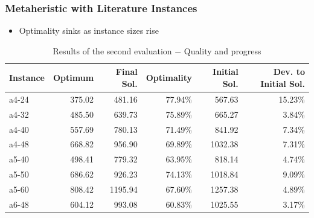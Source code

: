 \documentclass{beamer}
\begin{document}
\begin{frame}
\frametitle{Metaheristic with Literature Instances}
\begin{itemize}
\item Optimality sinks as instance sizes rise
\end{itemize}
\begin{table}[H]
\centering
\caption{Results of the second evaluation $-$ Quality and progress}
\scriptsize
{}
\begin{tabular}{l | r | r | r | r | r}
\hline
Instance & Optimum & Final Sol. & Optimality & Initial Sol. & Dev. to Initial Sol.\\
\hline
a4-24 & 	375.02 & 	481.16 & 	77.94\% & 	567.63 & 	15.23\% \\
a4-32 & 	485.50 & 	639.73 & 	75.89\% & 	665.27 & 	3.84\% \\
a4-40 & 	557.69 & 	780.13 & 	71.49\% & 	841.92 & 	7.34\% \\
a4-48 & 	668.82 & 	956.90 & 	69.89\% & 	1032.38 & 	7.31\% \\
a5-40 & 	498.41 & 	779.32 & 	63.95\% & 	818.14 & 	4.74\% \\
a5-50 & 	686.62 & 	926.23 & 	74.13\% & 	1018.84 & 	9.09\% \\
a5-60 & 	808.42 & 	1195.94 & 	67.60\% & 	1257.38 & 	4.89\% \\
a6-48 & 	604.12 & 	993.08 & 	60.83\% & 	1025.55 & 	3.17\% \\
\hline
\end{tabular}
\end{table}
\end{frame}
\end{document}
